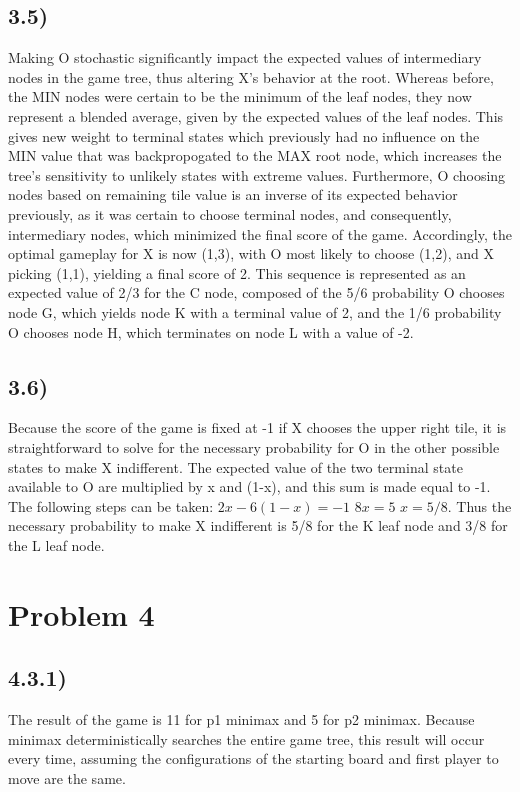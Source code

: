 \documentclass[11pt]{article}
\begin{document}
\subsection*{3.5)}
Making O stochastic significantly impact the expected values of intermediary nodes in the game tree, thus altering X's behavior at the root.
Whereas before, the MIN nodes were certain to be the minimum of the leaf nodes, they now represent a blended average,
given by the expected values of the leaf nodes.
This gives new weight to terminal states which previously had no influence on the MIN value that was backpropogated to the MAX root node,
which increases the tree's sensitivity to unlikely states with extreme values. Furthermore, O choosing nodes based on remaining tile value
is an inverse of its expected behavior previously, as it was certain to choose terminal nodes, and consequently, intermediary nodes, which minimized the
final score of the game.
Accordingly, the optimal gameplay for X is now (1,3), with O most likely to choose (1,2), and X picking (1,1), yielding a final score of 2.
This sequence is represented as an expected value of 2/3 for the C node,
composed of the 5/6 probability O chooses node G, which yields node K with a terminal value of 2, and the 1/6 probability O chooses node H,
which terminates on node L with a value of -2.

\subsection*{3.6)}
Because the score of the game is fixed at -1 if X chooses the upper right tile,
it is straightforward to solve for the necessary probability for O in the other possible states to make X indifferent.
The expected value of the two terminal state available to O are multiplied by x and (1-x), and this sum is made equal to -1.
The following steps can be taken:
$2x -6(1-x) = -1$
$8x = 5$
$x = 5/8$.
\linebreak Thus the necessary probability to make X indifferent is 5/8 for the K leaf node and 3/8 for the L leaf node.

\newpage

\section*{Problem 4}

\subsection*{4.3.1)}
The result of the game is 11 for p1 minimax and 5 for p2 minimax. Because minimax deterministically searches the entire game tree, this result will occur every time,
assuming the configurations of the starting board and first player to move are the same.
\end{document}
